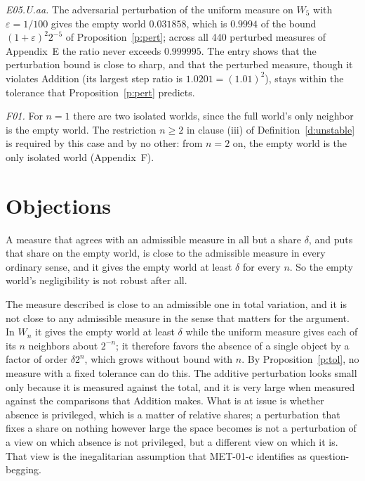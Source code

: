 \documentclass{situationist-preprint}
\begin{document}
\emph{E05.U.aa.} The adversarial perturbation of the uniform measure on $W_5$ with $\varepsilon = 1/100$ gives the empty world $0.031858$, which is $0.9994$ of the bound $(1+\varepsilon)^2 2^{-5}$ of Proposition~\ref{p:pert}; across all 440 perturbed measures of Appendix~E the ratio never exceeds $0.999995$. The entry shows that the perturbation bound is close to sharp, and that the perturbed measure, though it violates Addition (its largest step ratio is $1.0201 = (1.01)^2$), stays within the tolerance that Proposition~\ref{p:pert} predicts.

\emph{F01.} For $n = 1$ there are two isolated worlds, since the full world's only neighbor is the empty world. The restriction $n \geq 2$ in clause (iii) of Definition~\ref{d:unstable} is required by this case and by no other: from $n = 2$ on, the empty world is the only isolated world (Appendix~F).

\section{Objections}\label{s:obj}

\begin{objection}
A measure that agrees with an admissible measure in all but a share $\delta$, and puts that share on the empty world, is close to the admissible measure in every ordinary sense, and it gives the empty world at least $\delta$ for every $n$. So the empty world's negligibility is not robust after all.
\end{objection}

\begin{reply}
The measure described is close to an admissible one in total variation, and it is not close to any admissible measure in the sense that matters for the argument. In $W_n$ it gives the empty world at least $\delta$ while the uniform measure gives each of its $n$ neighbors about $2^{-n}$; it therefore favors the absence of a single object by a factor of order $\delta 2^n$, which grows without bound with $n$. By Proposition~\ref{p:tol}, no measure with a fixed tolerance can do this. The additive perturbation looks small only because it is measured against the total, and it is very large when measured against the comparisons that Addition makes. What is at issue is whether absence is privileged, which is a matter of relative shares; a perturbation that fixes a share on nothing however large the space becomes is not a perturbation of a view on which absence is not privileged, but a different view on which it is. That view is the inegalitarian assumption that MET-01-c identifies as question-begging.
\end{reply}
\end{document}
